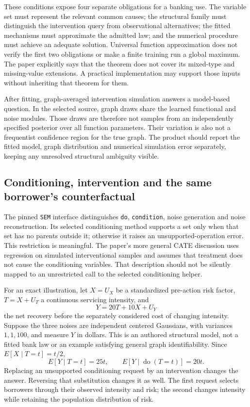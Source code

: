 These conditions expose four separate obligations for a banking use. The
variable set must represent the relevant common causes; the structural family
must distinguish the intervention query from observational alternatives;
the fitted mechanisms must approximate the admitted law; and the numerical
procedure must achieve an adequate solution. Universal function approximation
does not verify the first two obligations or make a finite training run a
global maximum. The paper explicitly says that the theorem does not cover
its mixed-type and missing-value extensions. A practical implementation may
support those inputs without inheriting that theorem for them.
\citep{exec14_causica_geffner}

After fitting, graph-averaged intervention simulation answers a model-based
question. In the selected source, graph draws share the learned functional
and noise modules. Those draws are therefore not samples from an independently
specified posterior over all function parameters. Their variation is also
not a frequentist confidence region for the true graph. The product should
report the fitted model, graph distribution and numerical simulation error
separately, keeping any unresolved structural ambiguity visible.
\citep{exec14_causica_primary}

\subsection{Conditioning, intervention and the same borrower's counterfactual}

The pinned \texttt{SEM} interface distinguishes \texttt{do},
\texttt{condition}, noise generation and noise reconstruction. Its selected
conditioning method supports a set only when that set has no parents outside
it; otherwise it raises an unsupported-operation error. This restriction is
meaningful. The paper's more general CATE discussion uses regression on
simulated interventional samples and assumes that treatment does not cause
the conditioning variables. That description should not be silently mapped
to an unrestricted call to the selected conditioning helper.
\citep{exec14_causica_primary,exec14_causica_geffner}

For an exact illustration, let \(X=U_X\) be a standardized pre-action risk
factor, \(T=X+U_T\) a continuous servicing intensity, and
\[
       Y=20T+10X+U_Y
\]
the net recovery before the separately considered cost of changing intensity.
Suppose the three noises are independent centered Gaussians, with variances
\(1,1,100\), and measure \(Y\) in dollars. This is an authored structural
model, not a fitted bank law or an example satisfying general graph
identifiability. Since \(E[X\mid T=t]=t/2\),
\[
 E[Y\mid T=t]=25t,\qquad E[Y\mid\operatorname{do}(T=t)]=20t.
\]
Replacing an unsupported conditioning request by an intervention changes the
answer. Reversing that substitution changes it as well. The first request
selects borrowers through their observed intensity and risk; the second
changes intensity while retaining the population distribution of risk.
\citep{exec14_causica_exact}

